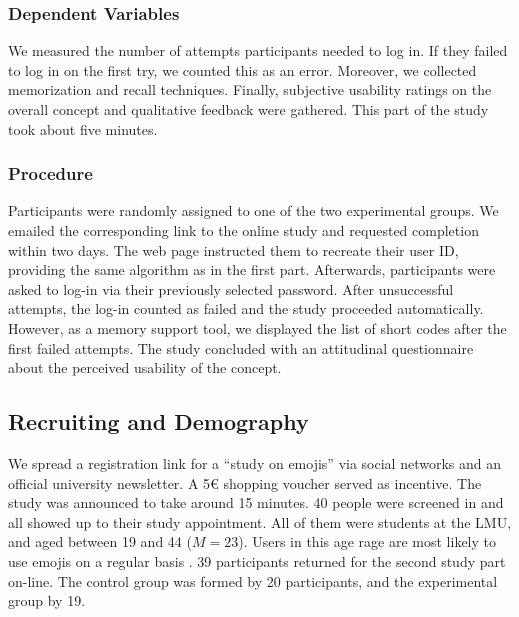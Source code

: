\subsubsection{Dependent Variables}
We measured the number of attempts participants needed to log in. If they failed to log in on the first try, we counted this as an error.  Moreover, we collected memorization and recall techniques. 
Finally, subjective usability ratings on the overall concept and qualitative feedback were gathered. This part of the study took about five minutes.

\subsubsection{Procedure}
Participants were randomly assigned to one of the two experimental groups. We emailed the corresponding link to the online study and requested completion within two days. 
The web page instructed them to recreate their user ID, providing the same algorithm as in the first part. Afterwards, participants were asked to log-in via their previously selected password. After unsuccessful attempts, the log-in counted as failed and the study proceeded automatically. However, as a memory support tool, we displayed the list of short codes after the first failed attempts. The study concluded with an attitudinal questionnaire about the perceived usability of the concept. 

\subsection{Recruiting and Demography}
We spread a registration link for a ``study on emojis'' via social networks and an official university newsletter. A 5€ shopping voucher served as incentive. The study was announced to take around 15 minutes. 40 people were screened in and all showed up to their study appointment. All of them were students at the LMU, and aged between 19 and 44 ($M=23$).  %
Users in this age rage are most likely to use emojis on a regular basis \cite{EmogiResearch2016}. 39 participants returned for the second study part on-line. The control group was formed by 20 participants, and the experimental group by 19. 
